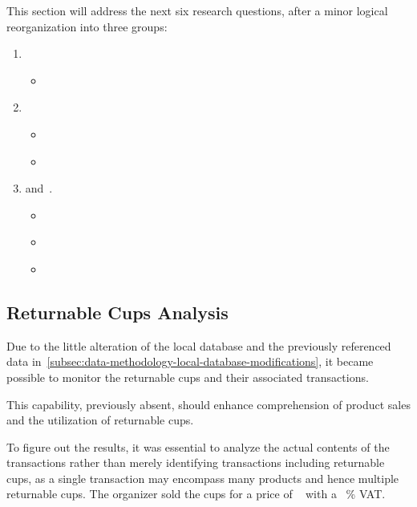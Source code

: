 This section will address the next six research questions, after a minor logical reorganization into three groups:
\begin{enumerate}
	\item {}
	\begin{itemize}
		\small
		\item \textit{}
	\end{itemize}
	\item {}
	\begin{itemize}
		\small
		\item \textit{}
		\item \textit{}
	\end{itemize}
	\item and~.
	\begin{itemize}
		\small
		\item \textit{}
		\item \textit{}
		\item \textit{}
	\end{itemize}
\end{enumerate}


\subsection{Returnable Cups Analysis}
\label{subsec:analysis-beverage-returnable-cups}

Due to the little alteration of the local database and the previously referenced data in~\autoref{subsec:data-methodology-local-database-modifications}, it became possible to monitor the returnable cups and their associated transactions.

This capability, previously absent, should enhance comprehension of product sales and the utilization of returnable cups.

\begin{rqbox}
	\textit{}
\end{rqbox}

To figure out the results, it was essential to analyze the actual contents of the transactions rather than merely identifying transactions including returnable cups,
as a single transaction may encompass many products and hence multiple returnable cups.
The organizer sold the cups for a price of ~ with a ~\% VAT.\


